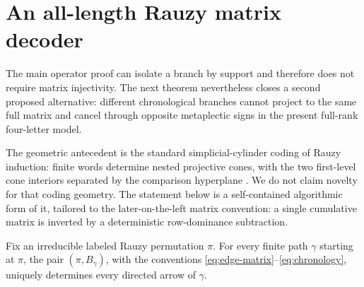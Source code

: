 \section{An all-length Rauzy matrix decoder}
\label{sec:decoder}

The main operator proof can isolate a branch by support and therefore does
not require matrix injectivity.  The next theorem nevertheless closes a
second proposed alternative: different chronological branches cannot project to
the same full matrix and cancel through opposite metaplectic signs in the
present full-rank four-letter model.

The geometric antecedent is the standard simplicial-cylinder coding of
Rauzy induction: finite words determine nested projective cones, with the
two first-level cone interiors separated by the comparison hyperplane
\citep{kerckhoff1985}.  We do not claim novelty for that coding geometry.
The statement below is a self-contained algorithmic form of it, tailored to
the later-on-the-left matrix convention: a single cumulative matrix is
inverted by a deterministic row-dominance subtraction.

\begin{theorem}
\label{thm:decoder}
Fix an irreducible labeled Rauzy permutation \(\pi\).  For every finite path
\(\gamma\) starting at \(\pi\), the pair \((\pi,B_\gamma)\), with the
conventions \eqref{eq:edge-matrix}--\eqref{eq:chronology}, uniquely
determines every directed arrow of \(\gamma\).
\end{theorem}


